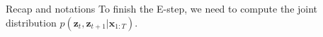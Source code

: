 \documentclass{beamer}
\newcommand{\MN}{{\mathcal N}}
\newcommand{\bs}[1]{\boldsymbol{#1}}
\newcommand{\paint}[2]{{\color{#1}#2}}
\begin{document}
\begin{frame}{Recap and notations}
  To finish the E-step, we need to compute the joint distribution $p(\bs{z}_t,\bs{z}_{t+1}|\bs{x}_{1:T})$.
%   
% 
\end{frame}
\end{document}
